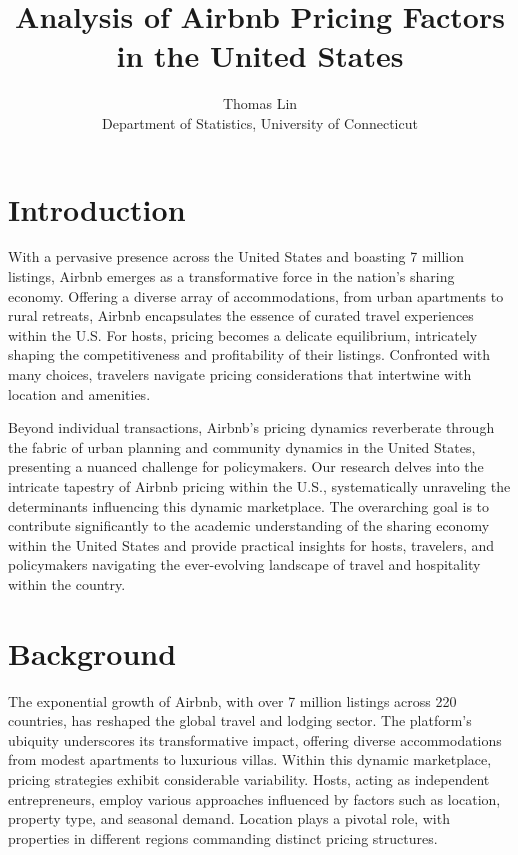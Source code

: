 \documentclass[12pt, letterpaper]{article}
\begin{document}
\title{Analysis of Airbnb Pricing Factors in the United States}
\author{Thomas Lin\\
Department of Statistics, University of Connecticut}
\maketitle

\section*{Introduction}
With a pervasive presence across the United States and boasting 7 million listings, Airbnb emerges as a transformative force in the nation's sharing economy. Offering a diverse array of accommodations, from urban apartments to rural retreats, Airbnb encapsulates the essence of curated travel experiences within the U.S. For hosts, pricing becomes a delicate equilibrium, intricately shaping the competitiveness and profitability of their listings. Confronted with many choices, travelers navigate pricing considerations that intertwine with location and amenities.

Beyond individual transactions, Airbnb's pricing dynamics reverberate through the fabric of urban planning and community dynamics in the United States, presenting a nuanced challenge for policymakers. Our research delves into the intricate tapestry of Airbnb pricing within the U.S., systematically unraveling the determinants influencing this dynamic marketplace. The overarching goal is to contribute significantly to the academic understanding of the sharing economy within the United States and provide practical insights for hosts, travelers, and policymakers navigating the ever-evolving landscape of travel and hospitality within the country.

\section*{Background}
The exponential growth of Airbnb, with over 7 million listings across 220 countries, has reshaped the global travel and lodging sector. The platform's ubiquity underscores its transformative impact, offering diverse accommodations from modest apartments to luxurious villas. Within this dynamic marketplace, pricing strategies exhibit considerable variability. Hosts, acting as independent entrepreneurs, employ various approaches influenced by factors such as location, property type, and seasonal demand. Location plays a pivotal role, with properties in different regions commanding distinct pricing structures.
\end{document}

